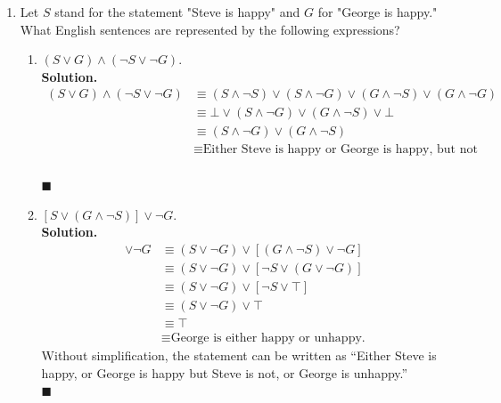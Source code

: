 \documentclass{report}
\newcommand{\sol}{\vspace{1em}\\\textbf{Solution.}\vspace{0.5em}}
\newcommand{\qed}{‎\\‎\hfill$\blacksquare$\vspace{1em}}
\begin{document}
\begin{enumerate}[leftmargin=*]
\begin{enumerate}
                  \item $\neg P \vee \neg S$.
                        \sol{}

                        Either I will not buy the pants or I will not buy the shirt. \qed
            \end{enumerate}

      \item Let $S$ stand for the statement "Steve is happy" and $G$ for "George is happy."
            What English sentences are represented by the following expressions?
            \begin{enumerate}
                  \item $(S \vee G) \wedge(\neg S \vee \neg G)$. \sol{}
                        \begin{align*}
                              (S \vee G) \wedge(\neg S \vee \neg G) & \equiv (S \wedge \neg S) \vee (S \wedge \neg G) \vee (G \wedge \neg S) \vee (G \wedge \neg G) \\
                                                                    & \equiv \bot \vee (S \wedge \neg G) \vee (G \wedge \neg S) \vee \bot                           \\
                                                                    & \equiv (S \wedge \neg G) \vee (G \wedge \neg S)                                               \\
                                                                    & \equiv \text{Either Steve is happy or George is happy, but not both.}
                        \end{align*} \qed

                  \item $[S \vee(G \wedge \neg S)] \vee \neg G$. \sol{}
                        \begin{align*}
                              [S \vee(G \wedge \neg S)] \vee \neg G & \equiv (S \vee \neg G) \vee [(G \wedge \neg S) \vee \neg G] \\
                                                                    & \equiv (S \vee \neg G) \vee [\neg S \vee (G \vee \neg G)]   \\
                                                                    & \equiv (S \vee \neg G) \vee [\neg S \vee \top]              \\
                                                                    & \equiv (S \vee \neg G) \vee \top                            \\
                                                                    & \equiv \top                                                 \\
                                                                    & \equiv \text{George is either happy or unhappy.}
                        \end{align*}
                        Without simplification, the statement can be written as ``Either Steve is happy, or George is happy but Steve is not, or George is unhappy.'' \qed


\end{enumerate}
\end{enumerate}
\end{document}
